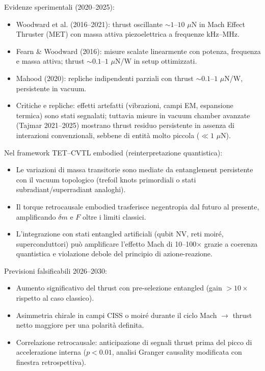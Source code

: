 \documentclass[11pt,a4paper]{article}
\theoremstyle{plain}
\theoremstyle{definition}
\begin{document}
\vspace{0.3cm}

Evidenze sperimentali (2020--2025):
\begin{itemize}
    \item Woodward et al. (2016--2021): thrust oscillante $\sim 1$--$10$ $\mu$N in Mach Effect Thruster (MET) con massa attiva piezoelettrica a frequenze kHz--MHz.
    \item Fearn \& Woodward (2016): misure scalate linearmente con potenza, frequenza e massa attiva; thrust $\sim 0.1$--$1$ $\mu$N/W in setup ottimizzati.
    \item Mahood (2020): repliche indipendenti parziali con thrust $\sim 0.1$--$1$ $\mu$N/W, persistente in vacuum.
    \item Critiche e repliche: effetti artefatti (vibrazioni, campi EM, espansione termica) sono stati segnalati; tuttavia misure in vacuum chamber avanzate (Tajmar 2021--2025) mostrano thrust residuo persistente in assenza di interazioni convenzionali, sebbene di entità molto piccola ($\ll 1$ $\mu$N).
\end{itemize}

Nel framework TET--CVTL embodied (reinterpretazione quantistica):
\begin{itemize}
    \item Le variazioni di massa transitorie sono mediate da entanglement persistente con il vacuum topologico (trefoil knots primordiali o stati subradiant/superradiant analoghi).
    \item Il torque retrocausale embodied trasferisce negentropia dal futuro al presente, amplificando $\delta m$ e $F$ oltre i limiti classici.
    \item L'integrazione con stati entangled artificiali (qubit NV, reti moiré, superconduttori) può amplificare l'effetto Mach di 10--100$\times$ grazie a coerenza quantistica e violazione debole del principio di azione-reazione.
\end{itemize}

Previsioni falsificabili 2026--2030:
\begin{itemize}
    \item Aumento significativo del thrust con pre-selezione entangled (gain $>10\times$ rispetto al caso classico).
    \item Asimmetria chirale in campi CISS o moiré durante il ciclo Mach $\to$ thrust netto maggiore per una polarità definita.
    \item Correlazione retrocausale: anticipazione di segnali thrust prima del picco di accelerazione interna ($p < 0.01$, analisi Granger causality modificata con finestra retrospettiva).
\end{itemize}
\end{document}
